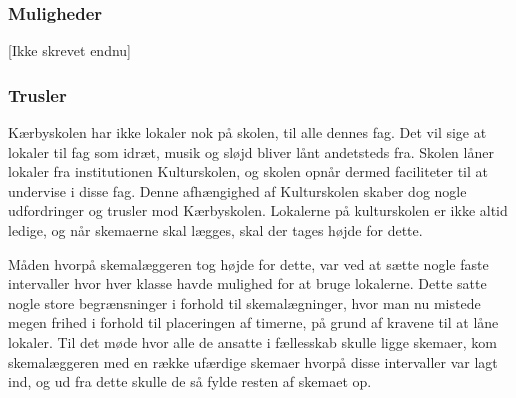\subsubsection*{Muligheder}
[Ikke skrevet endnu]

\subsubsection*{Trusler}
Kærbyskolen har ikke lokaler nok på skolen, til alle dennes fag. Det vil sige at lokaler til fag som idræt, musik og sløjd bliver lånt andetsteds fra. Skolen låner lokaler fra institutionen Kulturskolen, og skolen opnår dermed faciliteter til at undervise i disse fag. Denne afhængighed af Kulturskolen skaber dog nogle udfordringer og trusler mod Kærbyskolen. Lokalerne på kulturskolen er ikke altid ledige, og når skemaerne skal lægges, skal der tages højde for dette. 

Måden hvorpå skemalæggeren tog højde for dette, var ved at sætte nogle faste intervaller hvor hver klasse havde mulighed for at bruge lokalerne. Dette satte nogle store begrænsninger i forhold til skemalægninger, hvor man nu mistede megen frihed i forhold til placeringen af timerne, på grund af kravene til at låne lokaler. Til det møde hvor alle de ansatte i fællesskab skulle ligge skemaer, kom skemalæggeren med en række ufærdige skemaer hvorpå disse intervaller var lagt ind, og ud fra dette skulle de så fylde resten af skemaet op. 